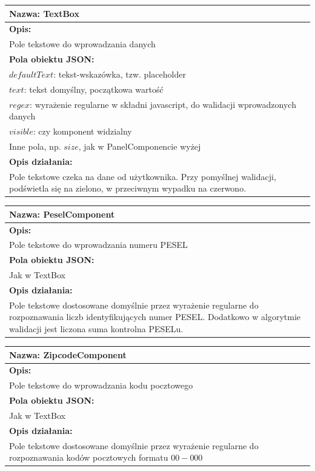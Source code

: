\documentclass[licencjacka]{pracamgr}
\begin{document}
\begin{tabularx}{\linewidth}{|X|}\hline
\textbf{Nazwa:}
TextBox
\\\hline
\textbf{Opis:}\\

Pole tekstowe do wprowadzania danych\\
\hline
\textbf{Pola obiektu JSON:} \\
$defaultText$: tekst-wskazówka, tzw. placeholder\\
$text$: tekst domyślny, początkowa wartość\\
$regex$: wyrażenie regularne w składni javascript, do walidacji wprowadzonych danych\\
$visible$: czy komponent widzialny\\
Inne pola, np. $size$, jak w PanelComponencie wyżej
\\\hline
\textbf{Opis działania:}\\
Pole tekstowe czeka na dane od użytkownika. Przy pomyślnej walidacji, podświetla się na zielono, w przeciwnym wypadku na czerwono.
\\\hline
\end{tabularx}

\begin{tabularx}{\linewidth}{|X|}\hline
\textbf{Nazwa:}
PeselComponent
\\\hline
\textbf{Opis:}\\

Pole tekstowe do wprowadzania numeru PESEL\\
\hline
\textbf{Pola obiektu JSON:} \\
Jak w TextBox
\\\hline
\textbf{Opis działania:}\\
Pole tekstowe dostosowane domyślnie przez wyrażenie regularne do rozpoznawania liczb identyfikujących numer PESEL.
Dodatkowo w algorytmie walidacji jest liczona suma kontrolna PESELu.
\\\hline
\end{tabularx}

\vspace{60pt}

\begin{tabularx}{\linewidth}{|X|}\hline
\textbf{Nazwa:}
ZipcodeComponent
\\\hline
\textbf{Opis:}\\

Pole tekstowe do wprowadzania kodu pocztowego\\
\hline
\textbf{Pola obiektu JSON:} \\
Jak w TextBox
\\\hline
\textbf{Opis działania:}\\
Pole tekstowe dostosowane domyślnie przez wyrażenie regularne do rozpoznawania kodów pocztowych formatu $00-000$
\\\hline
\end{tabularx}
\end{document}
